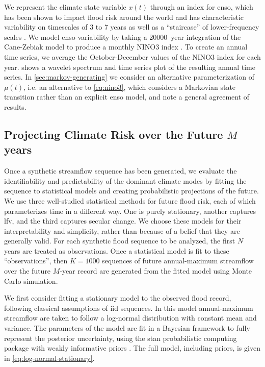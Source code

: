 \documentclass[
  draft,
  linenumbers
]{agujournal2018}
\makeatletter
\newcommand{\ie}{i.e.\@\xspace}
\makeatother
\begin{document}
We represent the climate state variable $x(t)$ through an index for \gls{enso}, which has been shown to impact flood risk around the world \citep{Ropelewski:1987do, Ward:2014gg} and has characteristic variability on timescales of 3 to 7 years \citep{Sarachik:2009dr} as well as a ``staircase'' of lower-frequency scales \citep{Jin:1994wq}.
We model \gls{enso} variability by taking a \SI{20000}{year} integration of the Cane-Zebiak model \citep{Zebiak:1987cl} to produce a monthly NINO3 index \citep{Ramesh:2016hf}.
To create an annual time series, we average the October-December values of the NINO3 index for each year.
 shows a wavelet spectrum and time series plot of the resulting annual time series.
In \cref{sec:markov-generating} we consider an alternative parameterization of $\mu(t)$, \ie an alternative to \cref{eq:nino3}, which considers a Markovian state transition rather than an explicit \gls{enso} model, and note a general agreement of results.

\subsection{Projecting Climate Risk over the Future $M$ years}\label{sec:methods-estimating}

Once a synthetic streamflow sequence has been generated, we evaluate the identifiability and predictability of the dominant climate modes by fitting the sequence to statistical models and creating probabilistic projections of the future.
We use three well-studied statistical methods for future flood risk, each of which parameterizes time in a different way.
One is purely stationary, another captures \gls{lfv}, and the third captures secular change.
We choose these models for their interpretability and simplicity, rather than because of a belief that they are generally valid.
For each synthetic flood sequence to be analyzed, the first $N$ years are treated as observations.
Once a statistical model is fit to these ``observations'', then $K=\num{1000}$ sequences of future annual-maximum streamflow over the future $M$-year record are generated from the fitted model using Monte Carlo simulation.

We first consider fitting a stationary model to the observed flood record, following classical assumptions of \gls{iid} sequences.
In this model annual-maximum streamflow are taken to follow a log-normal distribution with constant mean and variance.
The parameters of the model are fit  in a Bayesian framework to fully represent the posterior uncertainty, using the stan probabilistic computing package \citep{Carpenter:2017ke} with weakly informative priors \citep{gelman:2017,simpson:2017}.
The full model, including priors, is given in \cref{eq:log-normal-stationary}.
\end{document}
